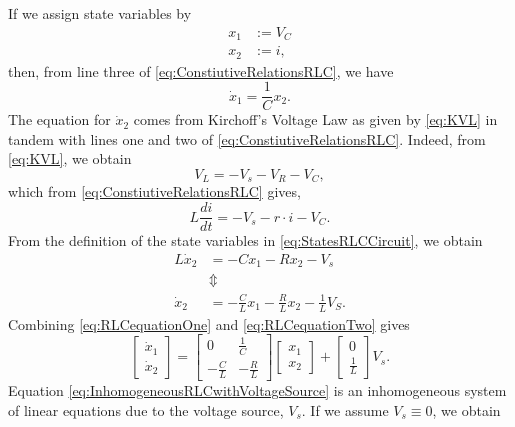 If we assign state variables by
\begin{equation}
\label{eq:StatesRLCCircuit}
    \begin{aligned}
        x_1 &:= V_C \\
        x_2 & := i,
    \end{aligned}
\end{equation}
then, from line three of \eqref{eq:ConstiutiveRelationsRLC}, we have 
\begin{equation}
\label{eq:RLCequationOne}
    \dot{x}_1 = \frac{1}{C} x_2.
\end{equation}
The equation for $ \dot{x}_2$ comes from Kirchoff's Voltage Law as given by \eqref{eq:KVL} in tandem with lines one and two of \eqref{eq:ConstiutiveRelationsRLC}. Indeed, from \eqref{eq:KVL}, we obtain
$$ V_L = -V_s - V_R - V_C,$$
which from \eqref{eq:ConstiutiveRelationsRLC} gives,
$$  L \frac{d i}{dt} = -V_s - r \cdot i - V_C.$$
From the definition of the state variables in \eqref{eq:StatesRLCCircuit}, we obtain
\begin{equation}
\label{eq:RLCequationTwo}
\begin{aligned}
     L \dot{x}_2 &= - Cx_1 -R x_2 -V_s \\
     &\Updownarrow \\
    \dot{x}_2 &= - \frac{C}{L}x_1 -\frac{R}{L} x_2 - \frac{1}{L}V_S . 
\end{aligned}
\end{equation}
Combining \eqref{eq:RLCequationOne} and \eqref{eq:RLCequationTwo} gives
\begin{equation}
\label{eq:InhomogeneousRLCwithVoltageSource}
\left[ \begin{array}{c} \dot{x}_1  \\ \dot{x}_2 \end{array} \right] = \left[ \begin{array}{cc} 0 & \frac{1}{C}\\- \frac{C}{L} & -\frac{R}{L} \end{array}\right] \left[ \begin{array}{c} x_1  \\ x_2 \end{array}\right] + \left[ \begin{array}{c} 0  \\  \frac{1}{L} \end{array}\right] V_s.
\end{equation}
Equation \eqref{eq:InhomogeneousRLCwithVoltageSource} is an inhomogeneous system of linear equations due to the voltage source, $V_s$. If we assume $V_s\equiv 0$, we obtain 
